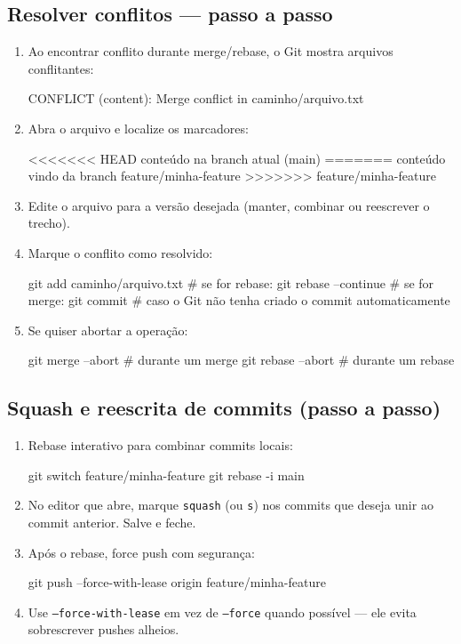 \subsection{Resolver conflitos — passo a passo}
\begin{enumerate}
  \item Ao encontrar conflito durante merge/rebase, o Git mostra arquivos conflitantes:
  \begin{bashcode}
  CONFLICT (content): Merge conflict in caminho/arquivo.txt
  \end{bashcode}
  \item Abra o arquivo e localize os marcadores:
  \begin{bashcode}
  <<<<<<< HEAD
  conteúdo na branch atual (main)
  =======
  conteúdo vindo da branch feature/minha-feature
  >>>>>>> feature/minha-feature
  \end{bashcode}
  \item Edite o arquivo para a versão desejada (manter, combinar ou reescrever o trecho).
  \item Marque o conflito como resolvido:
  \begin{bashcode}
  git add caminho/arquivo.txt
  # se for rebase:
  git rebase --continue
  # se for merge:
  git commit   # caso o Git não tenha criado o commit automaticamente
  \end{bashcode}
  \item Se quiser abortar a operação:
  \begin{bashcode}
  git merge --abort    # durante um merge
  git rebase --abort   # durante um rebase
  \end{bashcode}
\end{enumerate}

\subsection{Squash e reescrita de commits (passo a passo)}
\begin{enumerate}
  \item Rebase interativo para combinar commits locais:
  \begin{bashcode}
  git switch feature/minha-feature
  git rebase -i main
  \end{bashcode}
  \item No editor que abre, marque \texttt{squash} (ou \texttt{s}) nos commits que deseja unir ao commit anterior. Salve e feche.
  \item Após o rebase, force push com segurança:
  \begin{bashcode}
  git push --force-with-lease origin feature/minha-feature
  \end{bashcode}
  \item Use \texttt{--force-with-lease} em vez de \texttt{--force} quando possível — ele evita sobrescrever pushes alheios.
\end{enumerate}

